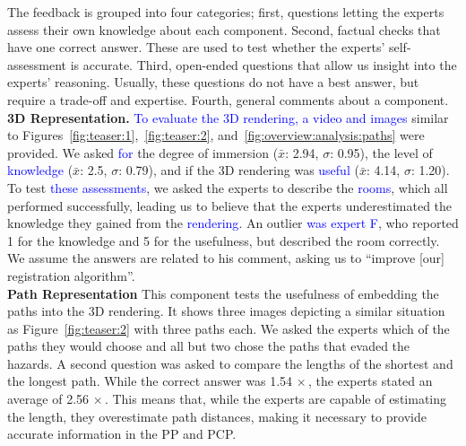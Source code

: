\documentclass{egpubl}
\newcommand{\diff}[1]{\textcolor{blue}{#1}}
\begin{document}
The feedback is grouped into four categories; first, questions letting the experts assess their own knowledge about each component. Second, factual checks that have one correct answer. These are used to test whether the experts' self-assessment is accurate. Third, open-ended questions that allow us insight into the experts' reasoning. Usually, these questions do not have a best answer, but require a trade-off and expertise. Fourth, general comments about a component.\\
%
\noindent \textbf{3D Representation.} \diff{To evaluate the 3D rendering, a video and images} similar to Figures~\ref{fig:teaser:1},~\ref{fig:teaser:2}, and~\ref{fig:overview:analysis:paths} were provided. We asked \diff{for} the degree of immersion ($\bar{x}$: 2.94, $\sigma$: 0.95), the level of \diff{knowledge} ($\bar{x}$: 2.5, $\sigma$: 0.79), and if the 3D rendering was \diff{useful} ($\bar{x}$: 4.14, $\sigma$: 1.20). To test \diff{these assessments}, we asked the experts to describe the \diff{rooms}, which all performed successfully, leading us to believe that the experts underestimated the knowledge they gained from the \diff{rendering}. An outlier \diff{was expert F}, who reported 1 for the knowledge and 5 for the usefulness, but described the room correctly. We assume the answers are related to his comment, asking us to ``improve [our] registration algorithm''. \\
%
\textbf{Path Representation} This component tests the usefulness of embedding the paths into the 3D rendering. It shows three images depicting a similar situation as Figure~\ref{fig:teaser:2} with three paths each. We asked the experts which of the paths they would choose and all but two chose the paths that evaded the hazards. A second question was asked to compare the lengths of the shortest and the longest path. While the correct answer was 1.54$\,\times$, the experts stated an average of 2.56$\,\times$. This means that, while the experts are capable of estimating the length, they overestimate path distances, making it necessary to provide accurate information in the PP and PCP.\\
%
\end{document}
